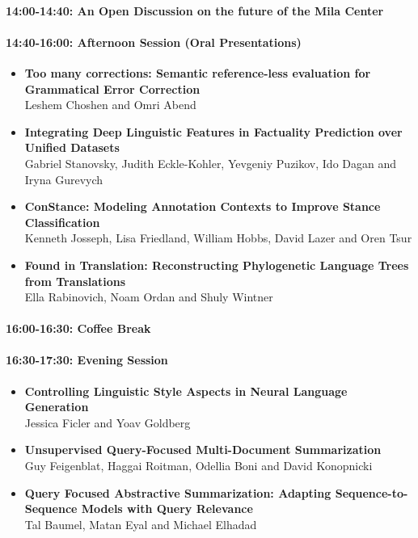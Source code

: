 \documentclass[a0,portrait]{a0poster}
\begin{document}
\paragraph{14:00-14:40: An Open Discussion on the future of the Mila
Center}\label{an-open-discussion-on-the-future-of-the-mila-center}

\paragraph{14:40-16:00: Afternoon Session (Oral
Presentations)}\label{afternoon-session-oral-presentations}

\begin{itemize}
\item
  \textbf{Too many corrections: Semantic reference-less evaluation for
  Grammatical Error Correction}\\
  Leshem Choshen and Omri Abend
\item
  \textbf{Integrating Deep Linguistic Features in Factuality Prediction
  over Unified Datasets}\\
  Gabriel Stanovsky, Judith Eckle-Kohler, Yevgeniy Puzikov, Ido Dagan
  and Iryna Gurevych
\item
  \textbf{ConStance: Modeling Annotation Contexts to Improve Stance
  Classification}\\
  Kenneth Josseph, Lisa Friedland, William Hobbs, David Lazer and Oren
  Tsur
\item
  \textbf{Found in Translation: Reconstructing Phylogenetic Language
  Trees from Translations}\\
  Ella Rabinovich, Noam Ordan and Shuly Wintner
\end{itemize}

\paragraph{16:00-16:30: Coffee Break}\label{coffee-break-1}

\paragraph{16:30-17:30: Evening Session}\label{evening-session}

\begin{itemize}
\item
  \textbf{Controlling Linguistic Style Aspects in Neural Language
  Generation}\\
  Jessica Ficler and Yoav Goldberg
\item
  \textbf{Unsupervised Query-Focused Multi-Document Summarization}\\
  Guy Feigenblat, Haggai Roitman, Odellia Boni and David Konopnicki
\item
  \textbf{Query Focused Abstractive Summarization: Adapting
  Sequence-to-Sequence Models with Query Relevance}\\
  Tal Baumel, Matan Eyal and Michael Elhadad
\end{itemize}
\end{document}
